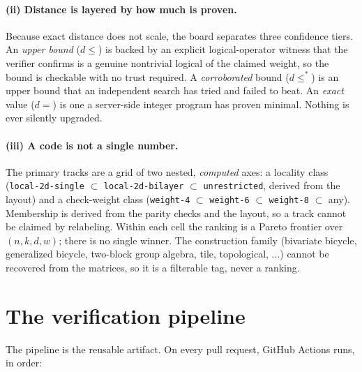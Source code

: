 \documentclass[11pt]{article}
\begin{document}
\paragraph{(ii) Distance is layered by how much is proven.} Because exact
distance does not scale, the board separates three confidence tiers. An
\emph{upper bound} ($d \le$) is backed by an explicit logical-operator witness
that the verifier confirms is a genuine nontrivial logical of the claimed weight,
so the bound is checkable with no trust required. A \emph{corroborated} bound
($d \le^{*}$) is an upper bound that an independent search has tried and failed
to beat. An \emph{exact} value ($d =$) is one a server-side integer program has
proven minimal. Nothing is ever silently upgraded.

\paragraph{(iii) A code is not a single number.} The primary tracks are a grid
of two nested, \emph{computed} axes: a locality class
(\texttt{local-2d-single} $\subset$ \texttt{local-2d-bilayer} $\subset$
\texttt{unrestricted}, derived from the layout) and a check-weight class
(\texttt{weight-4} $\subset$ \texttt{weight-6} $\subset$ \texttt{weight-8}
$\subset$ any). Membership is derived from the parity checks and the layout, so a
track cannot be claimed by relabeling. Within each cell the ranking is a Pareto
frontier over $(n,k,d,w)$; there is no single winner. The construction family
(bivariate bicycle, generalized bicycle, two-block group algebra, tile,
topological, ...) cannot be recovered from the matrices, so it is a filterable
tag, never a ranking.

\section{The verification pipeline}

The pipeline is the reusable artifact. On every pull request, GitHub Actions
runs, in order:
\end{document}
